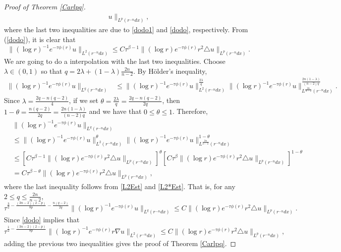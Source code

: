 \documentclass[11pt]{amsart}
\theoremstyle{plain}
\numberwithin{equation}{section}
\begin{document}
\begin{proof}[Proof of Theorem \ref{Carlpq}]
\begin{align}
u\|_{L^p(r^{-n} dx)}, \label{L2*Est}
\end{align}
where the last two inequalities are due to \eqref{dodo1} and \eqref{dodo}, respectively.
From (\ref{dodo}), it is clear that
\begin{equation}
\|(\log r)^{-1} e^{-\tau \phi(r)}u\|_{L^2(r^{-n}dx)}
\leq  C \tau^{{\beta} -1} \|(\log r ) e^{-\tau \phi(r)} r^2 \triangle u\|_{L^p(r^{-n} dx)}.
\label{L2Est}
\end{equation}
We are going to do a interpolation with the last two inequalities.
Choose ${\lambda} \in {\left( {0,1} \right) }$ so that $q = 2 {\lambda} + {\left( {1-{\lambda}} \right) } \frac{2n}{n-2}$.
By H\"older's inequality,
\begin{align*}
\|(\log r)^{-1} e^{-\tau \phi(r)}u\|_{L^q(r^{-n}dx)}
&\le \|(\log r)^{-1} e^{-\tau \phi(r)}u\|_{L^2(r^{-n}dx)}^{\frac{2{\lambda}}{q}} \|(\log r)^{-1} e^{-\tau \phi(r)}u\|_{L^{\frac{2n}{n-2}}(r^{-n}dx)}^{\frac{2n{\left( {1-{\lambda}} \right) }}{{\left( {n-2} \right) }q}}.
\end{align*}
Since ${\lambda}  = \frac{2q - n{\left( {q - 2} \right) } }{4}$, if we set ${\theta} = \frac{2{\lambda}}{q} = \frac{2q  - n{\left( {q -2} \right) }}{2q}$, then $1 - {\theta} = \frac{n{\left( {q-2} \right) }}{2q} = \frac{2n{\left( {1-{\lambda}} \right) }}{{\left( {n-2} \right) }q}$ and we have that $0\leq \theta\leq 1$.
Therefore,
\begin{align*}
& \|(\log r)^{-1} e^{-\tau \phi(r)}u\|_{L^q(r^{-n}dx)} \\
&\leq  \|(\log r)^{-1} e^{-\tau \phi(r)}u\|_{L^{2}(r^{-n}dx)}^{\theta} \|(\log
r)^{-1} e^{-\tau\phi(r)}u\|_{L^\frac{2n}{n-2}(r^{-n}dx)}^{1-\theta} \\
&\le {\left[{C\tau^{\beta-1} \|(\log r ) e^{-\tau \phi(r)} r^2 \triangle u\|_{L^p(r^{-n} dx)}}\right]}^{\theta}
{\left[{C \tau^\beta  \|(\log r ) e^{-\tau \phi(r)} r^2 \triangle u\|_{L^p(r^{-n} dx)}}\right]}^{1 - {\theta}} \\
&= C \tau^{\beta-{\theta}} \|(\log r ) e^{-\tau \phi(r)} r^2 \triangle u\|_{L^p(r^{-n} dx)},
\end{align*}
where the last inequality follows from \eqref{L2Est} and \eqref{L2*Est}.
That is, for any $2\leq q\leq \frac{2n}{n-2}$,
\begin{equation*}
\tau^{\frac 3 2 - \frac{{\left( {3n-2} \right) }{\left( {2-p} \right) }}{8p} - \frac{n{\left( {q -2} \right) }}{2q} }\|(\log r)^{-1} e^{-\tau
\phi(r)}u\|_{L^q(r^{-n}dx)} \leq C \|(\log r ) e^{-\tau \phi(r)} r^2
\triangle u\|_{L^p(r^{-n} dx)}.
\end{equation*}
Since \eqref{dodo} implies that
$$\tau^{\frac 1 2 - \frac{{\left( {3n-2} \right) }{\left( {2-p} \right) }}{8p}}   \|(\log r )^{-1} e^{-\tau \phi(r)}r \nabla u\|_{L^2(r^{-n}dx)} \leq  C \|(\log r ) e^{-\tau \phi(r)} r^2 \triangle u\|_{L^p(r^{-n}dx)},$$
adding the previous two inequalities gives the proof of Theorem \ref{Carlpq}.
\end{proof}
\end{document}
